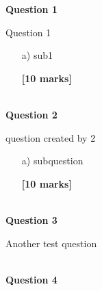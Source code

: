 \documentclass[11pt]{article}
\begin{document}
	\pagestyle{fancy}
	\fancyhf{}
	
	\setcounter{page}{1}
	
	
        \textbf{Question 1}

        Question 1
        \begin{enumerate}
            
        \item[a) ]sub1
        \begin{flushright}
            \textbf{[10 marks]}
        \end{flushright}
    
        \end{enumerate}
        ~\\
    
        \textbf{Question 2}

        question created by 2
        \begin{enumerate}
            
        \item[a) ]subquestion
        \begin{flushright}
            \textbf{[10 marks]}
        \end{flushright}
    
        \end{enumerate}
        ~\\
    
        \textbf{Question 3}

        Another test question
        \begin{enumerate}
            
        \end{enumerate}
        ~\\
    
        \textbf{Question 4}
\end{document}
